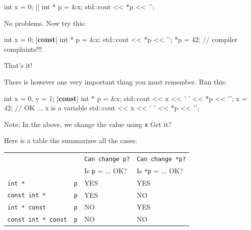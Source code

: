 \begin{consolethree}[escapeinside=||]
int x = 0;
|| int * p = &x;
std::cout << *p << '\n';
\end{consolethree}
No problems. Now try this:

\begin{consolethree}[escapeinside=||]
int x = 0;
|\textbf{const}| int * p = &x;
std::cout << *p << '\n';
*p = 42; // compiler complaints!!!
\end{consolethree}
That's it!

There is however one very important thing you must remember. Run this:

\begin{consolethree}[escapeinside=||]
int x = 0, y = 1;
|\textbf{const}| int * p = &x;
std::cout << x << ' ' << *p << '\n';
x = 42;                  // OK ... x is a variable
std::cout << x << ' ' << *p << '\n';
\end{consolethree}

Note:  In the above, we change the value using \texttt{x} Get it?

Here is a table the summarizes all the cases:







\begin{tabular}{l l l l}
    & & \texttt{Can change p?} & \texttt{Can change *p?} \\
    & & Is \texttt{p} = ... OK? & Is \texttt{*p} = ... OK? \\
    \texttt{int *} & \texttt{p} & YES & YES \\
    \texttt{const int *} & \texttt{p} & YES & NO \\
    \texttt{int * const} & \texttt{p} & NO & YES \\
    \texttt{const int * const} & \texttt{p} & NO & NO \\
\end{tabular}


